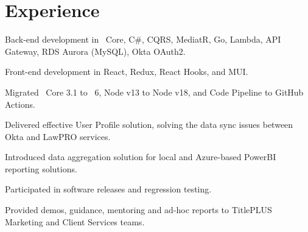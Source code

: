 \documentclass[letterpaper]{cv_12} %
\begin{document}
\hfill
%
%
\begin{minipage}[t]{0.59\textwidth}%


    \section{Experience}

    \sectionspace%


    \vspace{\topsep}
    \begin{tightitemize}
        \item Back-end development in \dotnet\ Core, C\#, CQRS,
        MediatR, Go, Lambda, API Gateway, RDS Aurora (MySQL), Okta OAuth2.
        \item Front-end development in React, Redux, React Hooks, and
        MUI.\@
        \item Migrated \dotnet\ Core 3.1 to \dotnet\ 6, Node v13 to
        Node v18, and Code Pipeline to GitHub Actions.
        \item Delivered effective User Profile solution, solving the
        data sync issues between Okta and LawPRO services.
        \item Introduced data aggregation solution for local and
        Azure-based PowerBI reporting solutions.
        \item Participated in software releases and regression testing.
        \item Provided demos, guidance, mentoring and ad-hoc reports to 
        TitlePLUS Marketing and Client Services teams.
    \end{tightitemize}

    \sectionspace%



\end{minipage}
\end{document}
